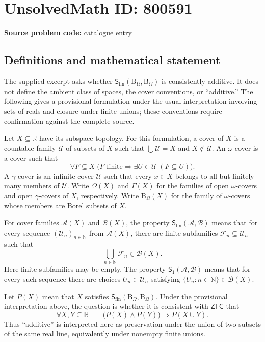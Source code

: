 \documentclass[11pt]{article}
\newcommand{\N}{\mathbb{N}}
\newcommand{\R}{\mathbb{R}}
\begin{document}
\section*{UnsolvedMath ID: 800591}
\textbf{Source problem code:} catalogue entry
\subsection{Definitions and mathematical statement}
The supplied excerpt asks whether \(\mathsf{S}_{\mathrm{fin}}(\mathrm{B}_\Omega,\mathrm{B}_\Omega)\) is consistently additive. It does not define the ambient class of spaces, the cover conventions, or ``additive.'' The following gives a provisional formulation under the usual interpretation involving sets of reals and closure under finite unions; these conventions require confirmation against the complete source.

Let \(X\subseteq\R\) have its subspace topology. For this formulation, a cover of \(X\) is a countable family \(\mathcal U\) of subsets of \(X\) such that \(\bigcup\mathcal U=X\) and \(X\notin\mathcal U\). An \(\omega\)-cover is a cover such that
\[
\forall F\subseteq X\;\bigl(F\text{ finite}\Longrightarrow\exists U\in\mathcal U\;(F\subseteq U)\bigr).
\]
A \(\gamma\)-cover is an infinite cover \(\mathcal U\) such that every \(x\in X\) belongs to all but finitely many members of \(\mathcal U\). Write \(\Omega(X)\) and \(\Gamma(X)\) for the families of open \(\omega\)-covers and open \(\gamma\)-covers of \(X\), respectively. Write \(\mathrm{B}_\Omega(X)\) for the family of \(\omega\)-covers whose members are Borel subsets of \(X\).

For cover families \(\mathcal A(X)\) and \(\mathcal B(X)\), the property \(\mathsf{S}_{\mathrm{fin}}(\mathcal A,\mathcal B)\) means that for every sequence \((\mathcal U_n)_{n\in\N}\) from \(\mathcal A(X)\), there are finite subfamilies \(\mathcal F_n\subseteq\mathcal U_n\) such that
\[
\bigcup_{n\in\N}\mathcal F_n\in\mathcal B(X).
\]
Here finite subfamilies may be empty. The property \(\mathsf{S}_1(\mathcal A,\mathcal B)\) means that for every such sequence there are choices \(U_n\in\mathcal U_n\) satisfying \(\{U_n:n\in\N\}\in\mathcal B(X)\).

Let \(P(X)\) mean that \(X\) satisfies \(\mathsf{S}_{\mathrm{fin}}(\mathrm{B}_\Omega,\mathrm{B}_\Omega)\). Under the provisional interpretation above, the question is whether it is consistent with \(\mathsf{ZFC}\) that
\[
\forall X,Y\subseteq\R\qquad
\bigl(P(X)\land P(Y)\bigr)\Longrightarrow P(X\cup Y).
\]
Thus ``additive'' is interpreted here as preservation under the union of two subsets of the same real line, equivalently under nonempty finite unions.
\end{document}
